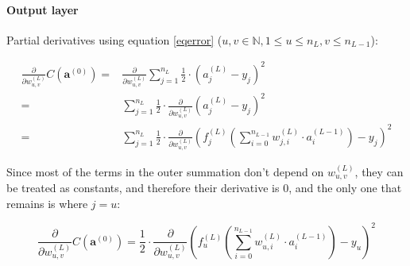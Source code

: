 \documentclass[titlepage]{article}
\begin{document}
        \paragraph{Output layer}

          Partial derivatives using equation \ref{eqerror}
          ($u, v \in \mathbb{N}, 1 \leq u \leq n_L, v \leq n_{L-1}$):

          \begin{equation}
            \begin{split}
              \frac{\partial}{\partial w_{u,v}^{(L)}}
                C \left( \mathbf{a}^{(0)} \right)
                  = & \frac{\partial}{\partial w_{u,v}^{(L)}}
                        \sum_{j=1}^{n_L}
                          \frac{1}{2} \cdot \left( a_j^{(L)} - y_j \right)^2 \\
                  = & \sum_{j=1}^{n_L}
                        \frac{1}{2}
                        \cdot
                        \frac{\partial}{\partial w_{u,v}^{(L)}}
                          \left( a_j^{(L)} - y_j \right)^2 \\
                  = & \sum_{j=1}^{n_L}
                        \frac{1}{2}
                        \cdot
                        \frac{\partial}{\partial w_{u,v}^{(L)}}
                          \left(
                            f_j^{(L)} \left(
                              \sum_{i=0}^{n_{L-1}}
                                w_{j,i}^{(L)} \cdot a_{i}^{(L-1)}
                            \right)
                            - y_j
                          \right)^2
            \end{split}
          \end{equation}

          Since most of the terms in the outer summation don't depend on
          $w_{u,v}^{(L)}$, they can be treated as constants, and therefore their
          derivative is 0, and the only one that remains is  where $j=u$:

          \begin{equation}
            \frac{\partial}{\partial w_{u,v}^{(L)}}
              C \left( \mathbf{a}^{(0)} \right)
                = \frac{1}{2}
                  \cdot
                  \frac{\partial}{\partial w_{u,v}^{(L)}}
                    \left(
                      f_{u}^{(L)} \left(
                        \sum_{i=0}^{n_{L-1}} w_{u,i}^{(L)} \cdot a_{i}^{(L-1)}
                      \right)
                      - y_{u}
                    \right)^2
          \end{equation}
\end{document}

